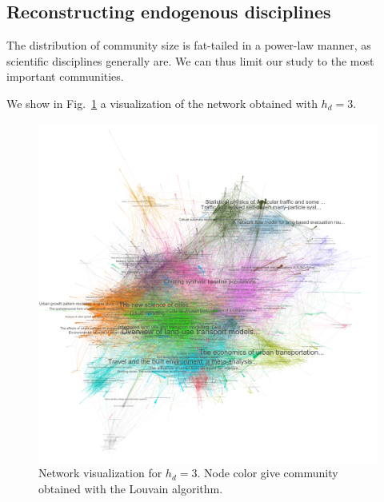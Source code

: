\subsection*{Reconstructing endogenous disciplines}


The distribution of community size is fat-tailed in a power-law manner, as scientific disciplines generally are. %
 We can thus limit our study to the most important communities.




We show in Fig.~\ref{fig:networkviz} a visualization of the network obtained with $h_d=3$.

\begin{figure}
    \centering
    \includegraphics{figures/corehdepth3filteredLOWRES.png}
    \caption{Network visualization for $h_d = 3$. Node color give community obtained with the Louvain algorithm.}
    \label{fig:networkviz}
\end{figure}





